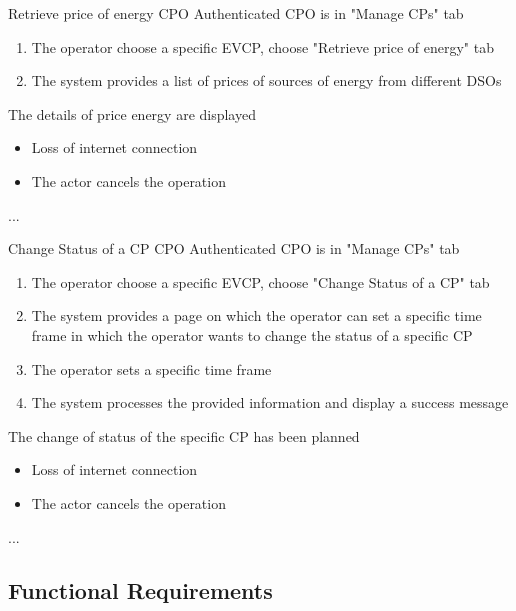 \usecase
{Retrieve price of energy} %
{CPO} %
{Authenticated CPO is in "Manage CPs" tab} %
{ %
    \begin{enumerate}
        \item The operator choose a specific EVCP, choose "Retrieve price of energy" tab
        \item The system provides a list of prices of sources of energy from different DSOs
    \end{enumerate}
}
{The details of price energy are displayed} %
{ %
    \begin{itemize}
        \item Loss of internet connection
        \item The actor cancels the operation
    \end{itemize}
}
{ %
    ...
}

\usecase
{Change Status of a CP} %
{CPO} %
{Authenticated CPO is in "Manage CPs" tab} %
{ %
    \begin{enumerate}
        \item The operator choose a specific EVCP, choose "Change Status of a CP" tab
        \item The system provides a page on which the operator can set a specific time frame in which the operator wants to change the status of a specific CP
        \item The operator sets a specific time frame
        \item The system processes the provided information and display a success message
    \end{enumerate}
}
{The change of status of the specific CP has been planned} %
{ %
    \begin{itemize}
        \item Loss of internet connection
        \item The actor cancels the operation
    \end{itemize}
}
{ %
    ...
}



\subsection{Functional Requirements}



